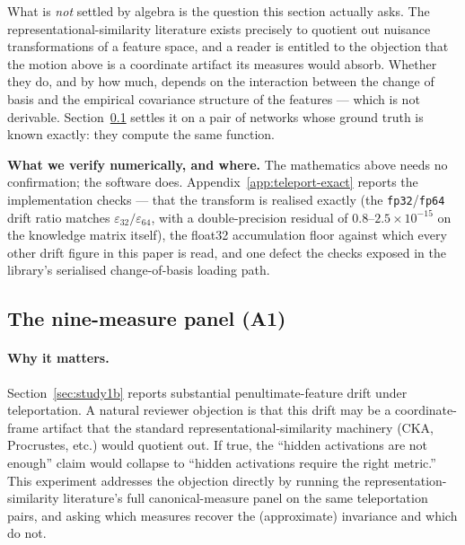 What is \emph{not} settled by algebra is the question this section actually asks.
The representational-similarity literature exists precisely to quotient out
nuisance transformations of a feature space, and a reader is entitled to the
objection that the motion above is a coordinate artifact its measures would
absorb. Whether they do, and by how much, depends on the interaction between the
change of basis and the empirical covariance structure of the features --- which
is not derivable. Section~\ref{sec:study1c} settles it on a pair of networks whose
ground truth is known exactly: they compute the same function.

\begin{clarifybox}
\textbf{What we verify numerically, and where.} The mathematics above needs no
confirmation; the software does. Appendix~\ref{app:teleport-exact} reports the
implementation checks --- that the transform is realised exactly (the
\texttt{fp32}/\texttt{fp64} drift ratio matches
$\varepsilon_{32}/\varepsilon_{64}$, with a double-precision residual of
$0.8$--$2.5\times10^{-15}$ on the knowledge matrix itself), the float32
accumulation floor against which every other drift figure in this paper is read,
and one defect the checks exposed in the library's serialised change-of-basis
loading path.
\end{clarifybox}

\subsection{The nine-measure panel (A1)}
\label{sec:study1c}
\label{sec:A1}

\paragraph{Why it matters.}
Section~\ref{sec:study1b} reports substantial penultimate-feature drift
under teleportation. A natural reviewer objection is that this drift may be
a coordinate-frame artifact that the standard representational-similarity
machinery (CKA, Procrustes, etc.) would quotient out. If true, the
``hidden activations are not enough'' claim would collapse to ``hidden
activations require the right metric.'' This experiment addresses the
objection directly by running the representation-similarity literature's
full canonical-measure panel on the same teleportation pairs, and asking
which measures recover the (approximate) invariance and which do not.

